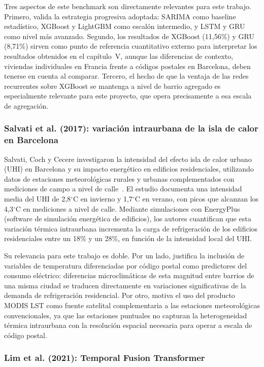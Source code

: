 \documentclass[12pt, a4paper]{article}
\begin{document}
Tres aspectos de este benchmark son directamente relevantes para este trabajo. Primero, valida la estrategia progresiva adoptada: SARIMA como baseline estadístico, XGBoost y LightGBM como escalón intermedio, y LSTM y GRU como nivel más avanzado. Segundo, los resultados de XGBoost (11,56\%) y GRU (8,71\%) sirven como punto de referencia cuantitativo externo para interpretar los resultados obtenidos en el capítulo~V, aunque las diferencias de contexto, viviendas individuales en Francia frente a códigos postales en Barcelona, deben tenerse en cuenta al comparar. Tercero, el hecho de que la ventaja de las redes recurrentes sobre XGBoost se mantenga a nivel de barrio agregado es especialmente relevante para este proyecto, que opera precisamente a esa escala de agregación.

\subsubsection{Salvati et al. (2017): variación intraurbana de la isla de calor en Barcelona}

Salvati, Coch y Cecere investigaron la intensidad del efecto isla de calor urbano (UHI) en Barcelona y su impacto energético en edificios residenciales, utilizando datos de estaciones meteorológicas rurales y urbanas complementados con mediciones de campo a nivel de calle~\cite{salvati2017}. El estudio documenta una intensidad media del UHI de 2,8$^\circ$C en invierno y 1,7$^\circ$C en verano, con picos que alcanzan los 4,3$^\circ$C en mediciones a nivel de calle. Mediante simulaciones con EnergyPlus (software de simulación energética de edificios), los autores cuantifican que esta variación térmica intraurbana incrementa la carga de refrigeración de los edificios residenciales entre un 18\% y un 28\%, en función de la intensidad local del UHI.

Su relevancia para este trabajo es doble. Por un lado, justifica la inclusión de variables de temperatura diferenciadas por código postal como predictores del consumo eléctrico: diferencias microclimáticas de esta magnitud entre barrios de una misma ciudad se traducen directamente en variaciones significativas de la demanda de refrigeración residencial. Por otro, motiva el uso del producto MODIS LST como fuente satelital complementaria a las estaciones meteorológicas convencionales, ya que las estaciones puntuales no capturan la heterogeneidad térmica intraurbana con la resolución espacial necesaria para operar a escala de código postal.

\subsubsection{Lim et al. (2021): Temporal Fusion Transformer}
\end{document}
